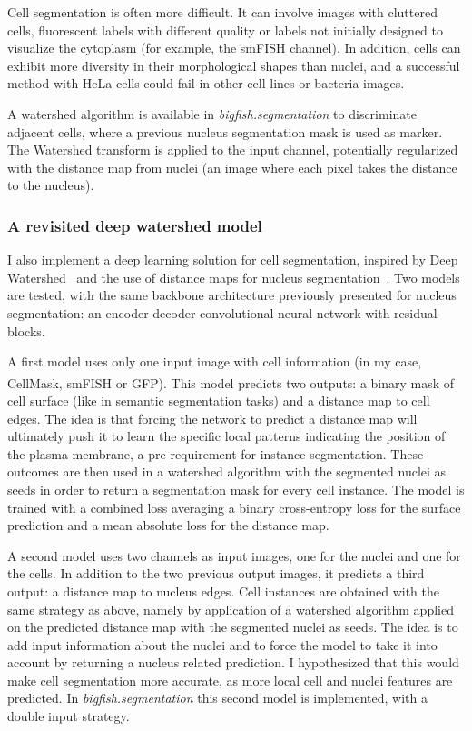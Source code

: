 Cell segmentation is often more difficult.
It can involve images with cluttered cells, fluorescent labels with different quality or labels not initially designed to visualize the cytoplasm (for example, the \ac{smFISH} channel).
In addition, cells can exhibit more diversity in their morphological shapes than nuclei, and a successful method with HeLa cells could fail in other cell lines or bacteria images.

A watershed algorithm is available in \emph{bigfish.segmentation} to discriminate adjacent cells, where 
a previous nucleus segmentation mask is used as marker.
The Watershed transform is applied to the input channel, potentially regularized with the distance map from nuclei (an image where each pixel takes the distance to the nucleus).

\subsubsection{A revisited deep watershed model}

I also implement a deep learning solution for cell segmentation, inspired by Deep Watershed~\cite{Bai_2017_CVPR} and the use of distance maps for nucleus segmentation~\cite{Naylor_2019}.
Two models are tested, with the same backbone architecture previously presented for nucleus segmentation: an encoder-decoder convolutional neural network with residual blocks.

A first model uses only one input image with cell information (in my case, CellMask\textsuperscript{\texttrademark}, \ac{smFISH} or \ac{GFP}).
This model predicts two outputs: a binary mask of cell surface (like in semantic segmentation tasks) and a distance map to cell edges.
The idea is that forcing the network to predict a distance map will ultimately push it to learn the specific local patterns indicating the position of the plasma membrane, a pre-requirement for instance segmentation.
These outcomes are then used in a watershed algorithm with the segmented nuclei as seeds in order to return a segmentation mask for every cell instance.
The model is trained with a combined loss averaging a binary cross-entropy loss for the surface prediction and a mean absolute loss for the distance map.

A second model uses two channels as input images, one for the nuclei and one for the cells.
In addition to the two previous output images, it predicts a third output: a distance map to nucleus edges.
Cell instances are obtained with the same strategy as above, namely by application of a watershed algorithm  applied on the predicted distance map with the segmented nuclei as seeds.
The idea is to add input information about the nuclei and to force the model to take it into account by returning a nucleus related prediction.
I hypothesized that this would make cell segmentation more accurate, as more local cell and nuclei features are predicted.
In \emph{bigfish.segmentation} this second model is implemented, with a double input strategy.\\

